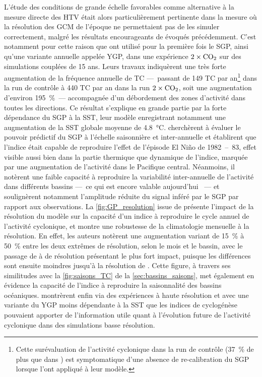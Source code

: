 \documentclass[../main.tex]{subfiles}
\begin{document}
L'étude des conditions de grande échelle favorables comme alternative à la mesure directe des HTV était alors particulièrement pertinente dans la mesure où la
résolution des GCM de l'époque ne permettaient pas de les simuler correctement, malgré les résultats encourageants de \cite{broccoli_can_1990} évoqués
précédemment. C'est notamment pour cette raison que \hbox{\cite{ryan_tropical_1992}} ont utilisé pour la première fois le SGP, ainsi qu'une variante annuelle
appelée YGP, dans une expérience \ensuremath{2\times\ce{CO2}} sur des simulations couplées de \num{15} ans. Leurs travaux indiquèrent une très forte
augmentation de la fréquence annuelle de TC ---~passant de \num{149} TC par an\footnote{Cette surévaluation de l'activité cyclonique dans la run de contrôle
(\SI{37}{\percent} de plus que dans \cite{gray_tropical_1975}) est symptomatique d'une absence de re-calibration du SGP lorsque \cite{ryan_tropical_1992}
l'ont appliqué à leur modèle.} dans la run de contrôle à \num{440} TC par an dans la run \ensuremath{2\times\ce{CO2}}, soit une augmentation d'environ
\SI{195}{\percent}~--- accompagnée d'un débordement des zones d'activité dans toutes les directions. Ce résultat s'explique en grande partie par la forte
dépendance du SGP à la SST, leur modèle enregistrant notamment une augmentation de la SST globale moyenne de \SI{4.8}{\degreeCelsius}.
\mbox{\cite{watterson_seasonal_1995}} cherchèrent à évaluer le pouvoir prédictif du SGP à l'échelle saisonnière et inter-annuelle et établirent que l'indice
était capable de reproduire l'effet de l'épisode El Niño de \num{1982}~--~\num{83}, effet visible  aussi bien dans la partie thermique que dynamique de
l'indice, marquée par une augmentation de l'activité dans le Pacifique central. Néanmoins, il notèrent une faible capacité à reproduire la variabilité
inter-annuelle de l'activité dans différents bassins ---~ce qui est encore valable aujourd'hui \parencite{camargo_tropical_2007,camargo_tropical_2016}~--- et
soulignèrent notamment l'amplitude réduite du signal inféré par le SGP par rapport aux observations. La \cref{fig:GP_resolution} issue de
\cite{camargo_tropical_2007} présente l'impact de la résolution du modèle sur la capacité d'un indice à reproduire le cycle annuel de l'activité cyclonique, et
montre une robustesse de la climatologie mensuelle à la résolution. En effet, les auteurs notèrent une augmentation variant de \SI{15}{\percent} à
\SI{50}{\percent} entre les deux extrêmes de résolution, selon le mois et le bassin, avec le passage de  à  de résolution présentant le plus
fort impact, puisque les différences sont ensuite moindres jusqu'à la résolution de . Cette figure, à travers ses similitudes avec la
\cref{fig:saisons_TC} de la \cref{sec:bassins_saisons}, met également en évidence la capacité de l'indice à reproduire la saisonnalité des bassins océaniques.
\cite{mcdonald_tropical_2005,chauvin_response_2006} montrèrent enfin via des expériences à haute résolution et avec une variante du YGP moins dépendante à la SST
que les indices de cyclogénèse pouvaient apporter de l'information utile quant à l'évolution future de l'activité cyclonique dans des simulations basse
résolution.
\end{document}
